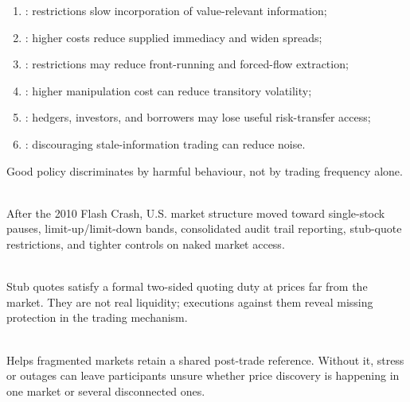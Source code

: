 \documentclass[a4paper,oneside,openany]{book}
\begin{document}
\begin{taxonomy} 
\begin{enumerate}[label=\roman*.]
\setlength{\itemsep}{0pt}
\item {}: restrictions slow incorporation of value-relevant information;
\item {}: higher costs reduce supplied immediacy and widen spreads;
\item {}: restrictions may reduce front-running and forced-flow extraction;
\item {}: higher manipulation cost can reduce transitory volatility;
\item {}: hedgers, investors, and borrowers may lose useful risk-transfer access;
\item {}: discouraging stale-information trading can reduce noise.
\end{enumerate}
Good policy discriminates by harmful behaviour, not by trading frequency alone.
\end{taxonomy}

\begin{marketrule} \\
After the 2010 Flash Crash, U.S. market structure moved toward single-stock pauses, limit-up/limit-down bands, consolidated audit trail reporting, stub-quote restrictions, and tighter controls on naked market access.
\end{marketrule}

\begin{caveat} \\
Stub quotes satisfy a formal two-sided quoting duty at prices far from the market. They are not real liquidity; executions against them reveal missing protection in the trading mechanism.
\end{caveat}

\begin{principle} \\
Helps fragmented markets retain a shared post-trade reference. Without it, stress or outages can leave participants unsure whether price discovery is happening in one market or several disconnected ones.
\end{principle}
\end{document}

